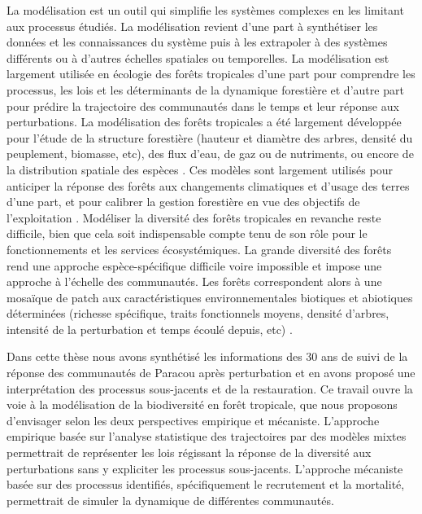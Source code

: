 \documentclass[
  11pt,
  french,
  A4paper,
  extrafontsizes,onecolumn,openright
  ]{memoir}
\begin{document}
La modélisation est un outil qui simplifie les systèmes complexes en les
limitant aux processus étudiés. La modélisation revient d'une part à
synthétiser les données et les connaissances du système puis à les
extrapoler à des systèmes différents ou à d'autres échelles spatiales ou
temporelles. La modélisation est largement utilisée en écologie des
forêts tropicales d'une part pour comprendre les processus, les lois et
les déterminants de la dynamique forestière et d'autre part pour prédire
la trajectoire des communautés dans le temps et leur réponse aux
perturbations. La modélisation des forêts tropicales a été largement
développée pour l'étude de la structure forestière (hauteur et diamètre
des arbres, densité du peuplement, biomasse, etc), des flux d'eau, de
gaz ou de nutriments, ou encore de la distribution spatiale des espèces
\autocites{Piponiot2016}{Rutishauser2016}{Grimm2017}. Ces modèles sont
largement utilisés pour anticiper la réponse des forêts aux changements
climatiques et d'usage des terres d'une part, et pour calibrer la
gestion forestière en vue des objectifs de l'exploitation
\autocite{Gourlet-Fleury2005}. Modéliser la diversité des forêts
tropicales en revanche reste difficile, bien que cela soit indispensable
compte tenu de son rôle pour le fonctionnements et les services
écosystémiques. La grande diversité des forêts rend une approche
espèce-spécifique difficile voire impossible et impose une approche à
l'échelle des communautés. Les forêts correspondent alors à une mosaïque
de patch aux caractéristiques environnementales biotiques et abiotiques
déterminées (richesse spécifique, traits fonctionnels moyens, densité
d'arbres, intensité de la perturbation et temps écoulé depuis, etc)
\autocite{Porte2002}.

Dans cette thèse nous avons synthétisé les informations des 30 ans de
suivi de la réponse des communautés de Paracou après perturbation et en
avons proposé une interprétation des processus sous-jacents et de la
restauration. Ce travail ouvre la voie à la modélisation de la
biodiversité en forêt tropicale, que nous proposons d'envisager selon
les deux perspectives empirique et mécaniste. L'approche empirique basée
sur l'analyse statistique des trajectoires par des modèles mixtes
permettrait de représenter les lois régissant la réponse de la diversité
aux perturbations sans y expliciter les processus sous-jacents.
L'approche mécaniste basée sur des processus identifiés, spécifiquement
le recrutement et la mortalité, permettrait de simuler la dynamique de
différentes communautés.
\end{document}
